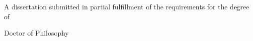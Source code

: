\title{\myTitle}
\begin{titlepage}
    \begin{center}
      \large

      \hfill

      \vfill

      \begingroup
      \color{CTtitle}\spacedallcaps{\LARGE\myTitle}

      \vspace{5mm}

      \Large{\mySubtitle}
      \endgroup
      \medskip

      \vspace{2cm}
      \spacedlowsmallcaps{\Large\myName}

      \vfill
      A dissertation submitted in partial fulfillment of the requirements
      for the degree of

      Doctor of Philosophy

      \vspace{2cm}

      \myDepartment\\
      \myUni\\
      \myLocation\\
      \myTime\\
      \medskip
    \end{center}
\end{titlepage}

\thispagestyle{empty}
